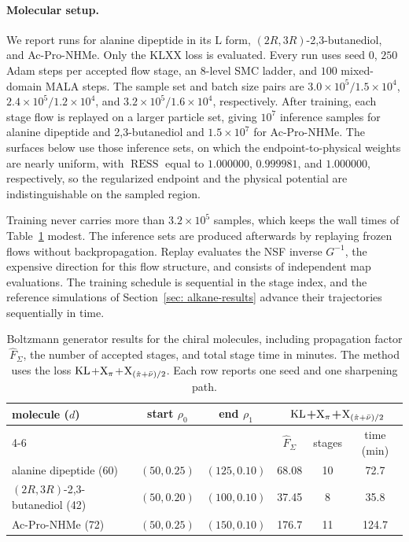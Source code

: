 \documentclass{article}
\begin{document}
\paragraph{Molecular setup.}
We report runs for alanine dipeptide in its \(\mathrm L\) form, \((2R,3R)\)-2,3-butanediol, and Ac-Pro-NHMe. Only the KLXX loss is evaluated. Every run uses seed \(0\), \(250\) Adam steps per accepted flow stage, an \(8\)-level SMC ladder, and \(100\) mixed-domain MALA steps. The sample set and batch size pairs are \(3.0\times10^5/1.5\times10^4\), \(2.4\times10^5/1.2\times10^4\), and \(3.2\times10^5/1.6\times10^4\), respectively. After training, each stage flow is replayed on a larger particle set, giving \(10^7\) inference samples for alanine dipeptide and 2,3-butanediol and \(1.5\times10^7\) for Ac-Pro-NHMe. The surfaces below use those inference sets, on which the endpoint-to-physical weights are nearly uniform, with \(\operatorname{RESS}\) equal to \(1.000000\), \(0.999981\), and \(1.000000\), respectively, so the regularized endpoint and the physical potential are indistinguishable on the sampled region.

Training never carries more than \(3.2\times10^5\) samples, which keeps the wall times of Table~\ref{tab: mol-chiral-summary} modest. The inference sets are produced afterwards by replaying frozen flows without backpropagation. Replay evaluates the NSF inverse \(G^{-1}\), the expensive direction for this flow structure, and consists of independent map evaluations. The training schedule is sequential in the stage index, and the reference simulations of Section~\ref{sec: alkane-results} advance their trajectories sequentially in time.

\begin{table}[htb]
\centering
\small
\setlength{\tabcolsep}{5pt}
\begin{tabular}{lccccc}
\toprule
\multirow{2}{*}{molecule (\(d\))} &
\multirow{2}{*}{start \(\rho_0\)} &
\multirow{2}{*}{end \(\rho_1\)} &
\multicolumn{3}{c}{$\mathrm{KL}$+$\mathrm{X}_\pi$+$\mathrm{X}_{(\hat\pi+\bar\nu)/2}$} \\
\cmidrule(l){4-6}
& & & \(\hat F_\Sigma\) & stages & time (min) \\
\midrule
alanine dipeptide (60)
& \((50,0.25)\) & \((125,0.10)\) & 68.08 & 10 & 72.7 \\
\addlinespace
\((2R,3R)\)-2,3-butanediol (42)
& \((50,0.20)\) & \((100,0.10)\) & 37.45 & 8 & 35.8 \\
\addlinespace
Ac-Pro-NHMe (72)
& \((50,0.25)\) & \((150,0.10)\) & 176.7 & 11 & 124.7 \\
\bottomrule
\end{tabular}
\caption{Boltzmann generator results for the chiral molecules, including propagation factor \(\hat F_\Sigma\), the number of accepted stages, and total stage time in minutes. The method uses the loss $\mathrm{KL}$+$\mathrm{X}_\pi$+$\mathrm{X}_{(\hat\pi+\bar\nu)/2}$. Each row reports one seed and one sharpening path.}
\label{tab: mol-chiral-summary}
\end{table}
\end{document}

